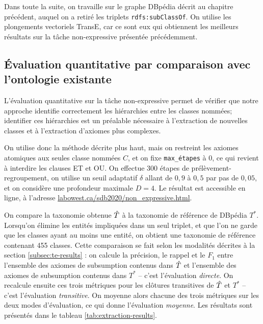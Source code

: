 Dans toute la suite, on travaille sur le graphe DBpédia décrit au chapitre précédent, auquel on a retiré les triplets \texttt{rdfs:subClassOf}. %
On utilise les plongements vectoriels TransE, car ce sont eux qui obtiennent les meilleurs résultats sur la tâche non-expressive présentée précédemment.



\subsection{Évaluation quantitative par comparaison avec l'ontologie existante}
\label{subsec:texp-reslts-quant}

L'évaluation quantitative sur la tâche non-expressive permet de vérifier que notre approche identifie correctement les hiérarchies entre les classes nommées; identifier ces hiérarchies est un préalable nécessaire à l'extraction de nouvelles classes et à l'extraction d'axiomes plus complexes.

On utilise donc la méthode décrite plus haut, mais on restreint les axiomes atomiques aux seules classe nommées $C$, et on fixe \texttt{max\_étapes} à $0$, ce qui revient à interdire les clauses ET et OU. On effectue 300 étapes de prélèvement-regroupement, on utilise un seuil adaptatif $\delta$ allant de $0,9$ à $0,5$ par pas de $0,05$, et on considère une profondeur maximale $D=4$. Le résultat est accessible en ligne, à l'adresse \href{http://labowest.ca/sdb2020/non_expressive.html}{labowest.ca/sdb2020/non\_expressive.html}.

On compare la taxonomie obtenue $\hat{T}$ à la taxonomie de référence de DBpédia $T^*$. Lorsqu'on élimine les entités impliquées dans un seul triplet, et que l'on ne garde que les classes ayant au moins une entité, on obtient une taxonomie de référence contenant 455 classes. Cette comparaison se fait selon les modalités décrites à la section \ref{subsec:te-results} : on calcule la précision, le rappel et le $F_1$ entre l'ensemble des axiomes de subsumption contenus dans $\hat{T}$ et l'ensemble des axiomes de subsumption contenus dans $T^*$ – c'est l'évaluation \textit{directe}. On recalcule ensuite ces trois métriques pour les clôtures transitives de $\hat{T}$ et $T^*$ – c'est l'évaluation \textit{transitive}. On moyenne alors chacune des trois métriques sur les deux modes d'évaluation, ce qui donne l'évaluation \textit{moyenne}. Les résultats sont présentés dans le tableau \ref{tab:extraction-results}.

